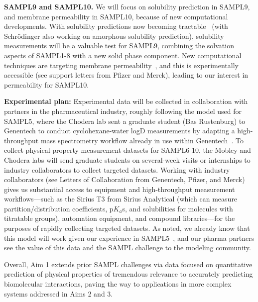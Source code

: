 \documentclass[11pt]{article}
\begin{document}
{\bf SAMPL9 and SAMPL10.}
We will focus on solubility prediction in SAMPL9, and membrane permeability in SAMPL10, because of new computational developments.
With solubility predictions now becoming tractable~\cite{Schnieders:2012:J.Chem.TheoryComput., park_absolute_2014, liu_using_2016} (with Schr\"{o}dinger also working on amorphous solubility prediction), solubility measurements will be a valuable test for SAMPL9, combining the solvation aspects of SAMPL1-8 with a new solid phase component.
New computational techniques are targeting membrane permeability~\cite{lee_permeability_2016, comer_permeability_2014}, and this is experimentally accessible (see support letters from Pfizer and Merck), leading to our interest in permeability for SAMPL10.
  
{\bf Experimental plan:}
Experimental data will be collected in collaboration with partners in the pharmaceutical industry, roughly following the model used for SAMPL5, where the Chodera lab sent a graduate student (Bas Rustenburg) to Genentech to conduct cyclohexane-water logD measurements by adapting a high-throughput mass spectrometry workflow already in use within Genentech~\cite{rustenburg_measuring_2016}.
To collect physical property measurement datasets for SAMPL6-10, the Mobley and Chodera labs will send graduate students on several-week visits or internships to industry collaborators to collect targeted datasets.
Working with industry collaborators (see Letters of Collaboration from Genentech, Pfizer, and Merck) gives us substantial access to equipment and high-throughput measurement workflows---such as the Sirius T3 from Sirius Analytical (which can measure partition/distribution coefficients, p$K_a$s, and solubilities for molecules with titratable groups), automation equipment, and compound libraries---for the purposes of rapidly collecting targeted datasets.
As noted, we already know that this model will work given our experience in SAMPL5~\cite{rustenburg_measuring_2016}, and our pharma partners see the value of this data and the SAMPL challenge to the modeling community.

Overall, Aim 1 extends prior SAMPL challenges via data focused on quantitative prediction of physical properties of tremendous relevance to accurately predicting biomolecular interactions, paving the way to applications in more complex systems addressed in Aims 2 and 3.
\end{document}

